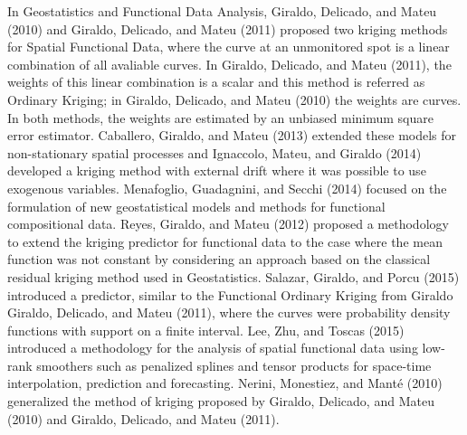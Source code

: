 \documentclass[12pt,]{article}
\theoremstyle{definition}
\theoremstyle{definition}
\theoremstyle{definition}
\theoremstyle{remark}
\begin{document}
In Geostatistics and Functional Data Analysis, Giraldo, Delicado, and Mateu (2010) and Giraldo, Delicado, and Mateu (2011) proposed two kriging methods for Spatial Functional Data, where the curve at an
unmonitored spot is a linear combination of all avaliable curves. In Giraldo, Delicado, and Mateu (2011), the weights of this linear combination is a scalar and this method is referred as
Ordinary Kriging; in Giraldo, Delicado, and Mateu (2010) the weights are curves.
In both methods, the weights are estimated by an unbiased minimum square error estimator.
Caballero, Giraldo, and Mateu (2013) extended these models for non-stationary spatial processes and Ignaccolo, Mateu, and Giraldo (2014) developed a kriging method with external drift where it was possible to use exogenous variables.
Menafoglio, Guadagnini, and Secchi (2014) focused on the formulation of new geostatistical models and methods for functional compositional data.
Reyes, Giraldo, and Mateu (2012) proposed a methodology to extend the kriging predictor for functional data to the case where the mean function was not constant by considering an approach based on the classical residual kriging method used in Geostatistics.
Salazar, Giraldo, and Porcu (2015) introduced a predictor, similar to the Functional Ordinary Kriging from Giraldo
Giraldo, Delicado, and Mateu (2011), where the curves were probability density functions with support on a finite interval.
Lee, Zhu, and Toscas (2015) introduced a methodology for the analysis of spatial functional data using low-rank smoothers such as penalized splines and tensor products for space-time interpolation, prediction and forecasting.
Nerini, Monestiez, and Manté (2010) generalized the method of kriging proposed by Giraldo, Delicado, and Mateu (2010) and Giraldo, Delicado, and Mateu (2011).
\end{document}
